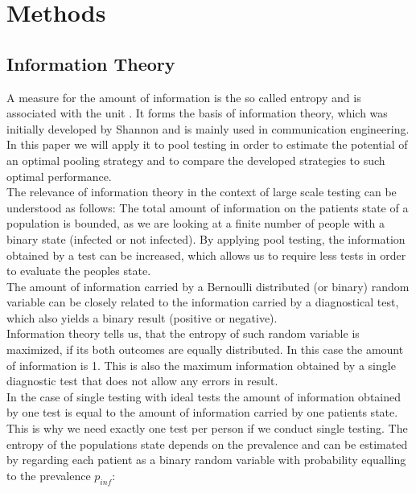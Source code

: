 \documentclass[fleqn,10pt]{wlscirep}
\begin{document}
\section{Methods}

\subsection{Information Theory}
A measure for the amount of information is the so called \glqq entropy\grqq{} and is associated with the unit \si{\Bit}. It forms the basis of information theory, which was initially developed by Shannon \cite{Shannon} and is mainly used in communication engineering. In this paper we will apply it to pool testing in order to estimate the potential of an optimal pooling strategy and to compare the developed strategies to such optimal performance.\\

The relevance of information theory in the context of large scale testing can be understood as follows: The total amount of information on the patients state of a population is bounded, as we are looking at a finite number of people with a binary state (infected or not infected). By applying pool testing, the information obtained by a test can be increased, which allows us to require less tests in order to evaluate the peoples state.\\

The amount of information carried by a Bernoulli distributed (or binary) random variable can be closely related to the information carried by a diagnostical test, which also yields a binary result (positive or negative).\\

Information theory tells us, that the entropy of such random variable is maximized, if its both outcomes are equally distributed. In this case the amount of information is \SI{1}{\Bit}. This is also the maximum information obtained by a single diagnostic test that does not allow any errors in result.\\

In the case of single testing with ideal tests the amount of information obtained by one test is equal to the amount of information carried by one patients state. This is why we need exactly one test per person if we conduct single testing. The entropy of the populations state depends on the prevalence and can be estimated by regarding each patient as a binary random variable with probability equalling to the prevalence $p_{inf}$:\\
\end{document}
